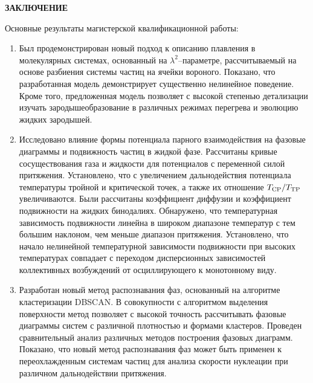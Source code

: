 
\begin{center}
\textbf{\large ЗАКЛЮЧЕНИЕ}
\end{center}


Основные результаты магистерской квалификационной работы:
\begin{enumerate}

    \item Был продемонстрирован новый подход к описанию плавления в молекулярных системах, основанный на $\lambda^2$--параметре, рассчитываемый на основе разбиения системы частиц на ячейки вороного.
    Показано, что разработанная модель демонстрирует существенно нелинейное поведение.
    Кроме того, предложенная модель позволяет с высокой степенью детализации изучать зародышеобразование в различных режимах перегрева и эволюцию жидких зародышей.

    \item Исследовано влияние формы потенциала парного взаимодействия на фазовые диаграммы и подвижность частиц в жидкой фазе.
    Рассчитаны кривые сосуществования газа и жидкости для потенциалов с переменной силой притяжения. 
    Установлено, что с увеличением дальнодействия потенциала температуры тройной и критической точек, а также их отношение $T_{\rm CP}/T_{\rm TP}$ увеличиваются.
    Были рассчитаны коэффициент диффузии и коэффициент подвижности на жидких бинодалиях.
    Обнаружено, что температурная зависимость подвижности линейна в широком диапазоне температур с тем большим наклоном, чем меньше диапазон притяжения.
    Установлено, что начало нелинейной температурной зависимости подвижности при высоких температурах совпадает с переходом дисперсионных зависимостей коллективных возбуждений от осциллирующего к монотонному виду.

    \item Разработан новый метод распознавания фаз, основанный на алгоритме кластеризации DBSCAN.
    В совокупности с алгоритмом выделения поверхности метод позволяет с высокой точность рассчитывать фазовые диаграммы систем с различной плотностью и формами кластеров.
    Проведен сравнительный анализ различных методов построения фазовых диаграмм.
    Показано, что новый метод распознавания фаз может быть применен к переохлажденным системам частиц для анализа скорости нуклеации при различном дальнодействии притяжения.

\end{enumerate}
